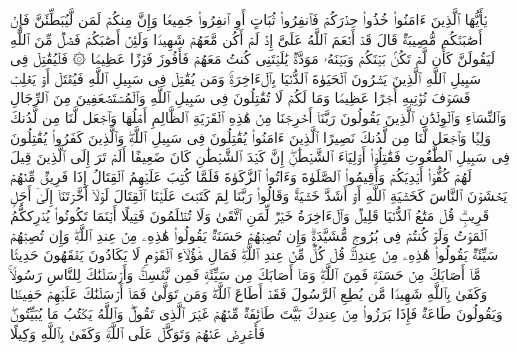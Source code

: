 یَٰۤأَیُّهَا ٱلَّذِینَ ءَامَنُوا۟ خُذُوا۟ حِذۡرَكُمۡ فَٱنفِرُوا۟ ثُبَاتٍ أَوِ ٱنفِرُوا۟ جَمِیعࣰا%
\stopbuffer
\startbuffer[\q:4:72]
وَإِنَّ مِنكُمۡ لَمَن لَّیُبَطِّئَنَّ فَإِنۡ أَصَٰبَتۡكُم مُّصِیبَةࣱ قَالَ قَدۡ أَنۡعَمَ ٱللَّهُ عَلَیَّ إِذۡ لَمۡ أَكُن مَّعَهُمۡ شَهِیدࣰا%
\stopbuffer
\startbuffer[\q:4:73]
وَلَئِنۡ أَصَٰبَكُمۡ فَضۡلࣱ مِّنَ ٱللَّهِ لَیَقُولَنَّ كَأَن لَّمۡ تَكُنۢ بَیۡنَكُمۡ وَبَیۡنَهُۥ مَوَدَّةࣱ یَٰلَیۡتَنِی كُنتُ مَعَهُمۡ فَأَفُوزَ فَوۡزًا عَظِیمࣰا%
\stopbuffer
\startbuffer[\q:4:74]
۞ فَلۡیُقَٰتِلۡ فِی سَبِیلِ ٱللَّهِ ٱلَّذِینَ یَشۡرُونَ ٱلۡحَیَوٰةَ ٱلدُّنۡیَا بِٱلۡءَاخِرَةِۚ وَمَن یُقَٰتِلۡ فِی سَبِیلِ ٱللَّهِ فَیُقۡتَلۡ أَوۡ یَغۡلِبۡ فَسَوۡفَ نُؤۡتِیهِ أَجۡرًا عَظِیمࣰا%
\stopbuffer
\startbuffer[\q:4:75]
وَمَا لَكُمۡ لَا تُقَٰتِلُونَ فِی سَبِیلِ ٱللَّهِ وَٱلۡمُسۡتَضۡعَفِینَ مِنَ ٱلرِّجَالِ وَٱلنِّسَاۤءِ وَٱلۡوِلۡدَٰنِ ٱلَّذِینَ یَقُولُونَ رَبَّنَاۤ أَخۡرِجۡنَا مِنۡ هَٰذِهِ ٱلۡقَرۡیَةِ ٱلظَّالِمِ أَهۡلُهَا وَٱجۡعَل لَّنَا مِن لَّدُنكَ وَلِیࣰّا وَٱجۡعَل لَّنَا مِن لَّدُنكَ نَصِیرًا%
\stopbuffer
\startbuffer[\q:4:76]
ٱلَّذِینَ ءَامَنُوا۟ یُقَٰتِلُونَ فِی سَبِیلِ ٱللَّهِۖ وَٱلَّذِینَ كَفَرُوا۟ یُقَٰتِلُونَ فِی سَبِیلِ ٱلطَّٰغُوتِ فَقَٰتِلُوۤا۟ أَوۡلِیَاۤءَ ٱلشَّیۡطَٰنِۖ إِنَّ كَیۡدَ ٱلشَّیۡطَٰنِ كَانَ ضَعِیفًا%
\stopbuffer
\startbuffer[\q:4:77]
أَلَمۡ تَرَ إِلَى ٱلَّذِینَ قِیلَ لَهُمۡ كُفُّوۤا۟ أَیۡدِیَكُمۡ وَأَقِیمُوا۟ ٱلصَّلَوٰةَ وَءَاتُوا۟ ٱلزَّكَوٰةَ فَلَمَّا كُتِبَ عَلَیۡهِمُ ٱلۡقِتَالُ إِذَا فَرِیقࣱ مِّنۡهُمۡ یَخۡشَوۡنَ ٱلنَّاسَ كَخَشۡیَةِ ٱللَّهِ أَوۡ أَشَدَّ خَشۡیَةࣰۚ وَقَالُوا۟ رَبَّنَا لِمَ كَتَبۡتَ عَلَیۡنَا ٱلۡقِتَالَ لَوۡلَاۤ أَخَّرۡتَنَاۤ إِلَىٰۤ أَجَلࣲ قَرِیبࣲۗ قُلۡ مَتَٰعُ ٱلدُّنۡیَا قَلِیلࣱ وَٱلۡءَاخِرَةُ خَیۡرࣱ لِّمَنِ ٱتَّقَىٰ وَلَا تُظۡلَمُونَ فَتِیلًا%
\stopbuffer
\startbuffer[\q:4:78]
أَیۡنَمَا تَكُونُوا۟ یُدۡرِككُّمُ ٱلۡمَوۡتُ وَلَوۡ كُنتُمۡ فِی بُرُوجࣲ مُّشَیَّدَةࣲۗ وَإِن تُصِبۡهُمۡ حَسَنَةࣱ یَقُولُوا۟ هَٰذِهِۦ مِنۡ عِندِ ٱللَّهِۖ وَإِن تُصِبۡهُمۡ سَیِّئَةࣱ یَقُولُوا۟ هَٰذِهِۦ مِنۡ عِندِكَۚ قُلۡ كُلࣱّ مِّنۡ عِندِ ٱللَّهِۖ فَمَالِ هَٰۤؤُلَاۤءِ ٱلۡقَوۡمِ لَا یَكَادُونَ یَفۡقَهُونَ حَدِیثࣰا%
\stopbuffer
\startbuffer[\q:4:79]
مَّاۤ أَصَابَكَ مِنۡ حَسَنَةࣲ فَمِنَ ٱللَّهِۖ وَمَاۤ أَصَابَكَ مِن سَیِّئَةࣲ فَمِن نَّفۡسِكَۚ وَأَرۡسَلۡنَٰكَ لِلنَّاسِ رَسُولࣰاۚ وَكَفَىٰ بِٱللَّهِ شَهِیدࣰا%
\stopbuffer
\startbuffer[\q:4:80]
مَّن یُطِعِ ٱلرَّسُولَ فَقَدۡ أَطَاعَ ٱللَّهَۖ وَمَن تَوَلَّىٰ فَمَاۤ أَرۡسَلۡنَٰكَ عَلَیۡهِمۡ حَفِیظࣰا%
\stopbuffer
\startbuffer[\q:4:81]
وَیَقُولُونَ طَاعَةࣱ فَإِذَا بَرَزُوا۟ مِنۡ عِندِكَ بَیَّتَ طَاۤئِفَةࣱ مِّنۡهُمۡ غَیۡرَ ٱلَّذِی تَقُولُۖ وَٱللَّهُ یَكۡتُبُ مَا یُبَیِّتُونَۖ فَأَعۡرِضۡ عَنۡهُمۡ وَتَوَكَّلۡ عَلَى ٱللَّهِۚ وَكَفَىٰ بِٱللَّهِ وَكِیلًا%
